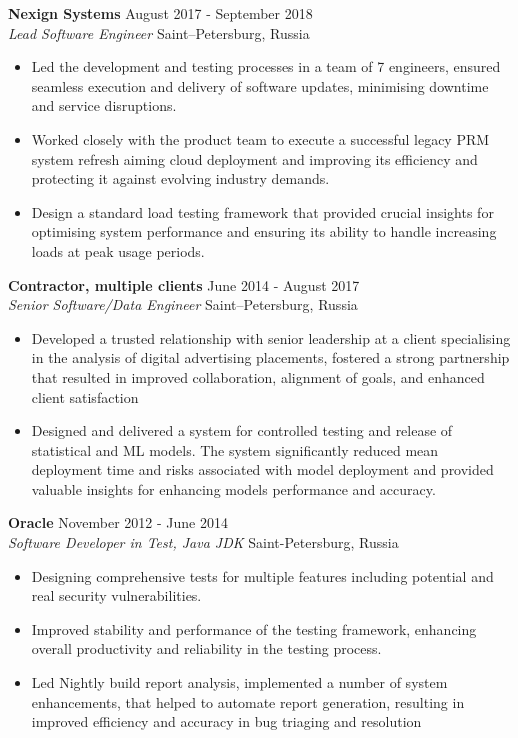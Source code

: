 \documentclass[a4paper]{article}
\newcommand{\employer} [4] {
    \textbf{#1} \hfill {#3} \\
    \textit{#2} \hfill {#4} \\
    \vspace{0mm}
}
\begin{document}
    \employer{Nexign Systems}{Lead Software Engineer}{August 2017 - September 2018}{Saint–Petersburg, Russia}
    \begin{itemize}[itemsep=-1mm]
        \item Led the development and testing processes in a team of 7 engineers, ensured seamless execution
        and delivery of software updates, minimising downtime and service disruptions.
        \item Worked closely with the product team to execute a successful legacy PRM system refresh aiming cloud deployment and
        improving its efficiency and protecting it against evolving industry demands.
        \item Design a standard load testing framework that provided crucial insights for optimising system
        performance and ensuring its ability to handle increasing loads at peak usage periods.
    \end{itemize}

    \employer{Contractor, multiple clients}{Senior Software/Data Engineer}{June 2014 - August 2017}{Saint–Petersburg, Russia}
    \begin{itemize}[itemsep=-1mm]
        \item Developed a trusted relationship with senior leadership at a client specialising in the analysis of digital advertising
        placements, fostered a strong partnership that resulted in improved collaboration, alignment of goals, and enhanced client
        satisfaction
        \item Designed and delivered a system for controlled testing and release of statistical and ML models. The system significantly
        reduced mean deployment time and risks associated with model deployment and provided valuable insights for enhancing
        models performance and accuracy.
    \end{itemize}

    \employer{Oracle}{Software Developer in Test, Java JDK}{November 2012 - June 2014}{Saint-Petersburg, Russia}
    \begin{itemize}[itemsep=-1mm]
        \item Designing comprehensive tests for multiple features including potential and real security vulnerabilities.
        \item Improved stability and performance of the testing framework, enhancing overall productivity and reliability
        in the testing process.
        \item Led Nightly build report analysis, implemented a number of system enhancements, that helped to automate report
        generation, resulting in improved efficiency and accuracy in bug triaging and resolution
    \end{itemize}
\end{document}

